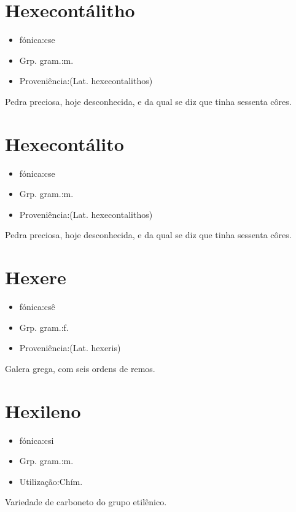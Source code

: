 \documentclass{article}
\begin{document}
\section{Hexecontálitho}
\begin{itemize}
\item {fónica:cse}
\end{itemize}
\begin{itemize}
\item {Grp. gram.:m.}
\end{itemize}
\begin{itemize}
\item {Proveniência:(Lat. \textunderscore hexecontalithos\textunderscore )}
\end{itemize}
Pedra preciosa, hoje desconhecida, e da qual se diz que tinha sessenta côres.
\section{Hexecontálito}
\begin{itemize}
\item {fónica:cse}
\end{itemize}
\begin{itemize}
\item {Grp. gram.:m.}
\end{itemize}
\begin{itemize}
\item {Proveniência:(Lat. \textunderscore hexecontalithos\textunderscore )}
\end{itemize}
Pedra preciosa, hoje desconhecida, e da qual se diz que tinha sessenta côres.
\section{Hexere}
\begin{itemize}
\item {fónica:csê}
\end{itemize}
\begin{itemize}
\item {Grp. gram.:f.}
\end{itemize}
\begin{itemize}
\item {Proveniência:(Lat. \textunderscore hexeris\textunderscore )}
\end{itemize}
Galera grega, com seis ordens de remos.
\section{Hexileno}
\begin{itemize}
\item {fónica:csi}
\end{itemize}
\begin{itemize}
\item {Grp. gram.:m.}
\end{itemize}
\begin{itemize}
\item {Utilização:Chím.}
\end{itemize}
Variedade de carboneto do grupo etilênico.
\end{document}

